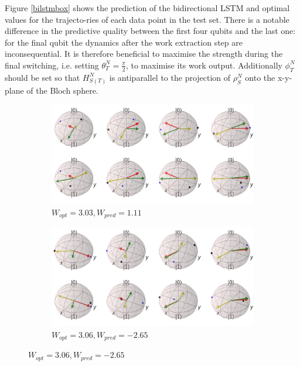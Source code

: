 Figure \ref{bilstmbox} shows the prediction of the bidirectional LSTM and optimal values for the trajecto-ries of each data point in the test set.
There is a notable difference in the predictive quality between the first four qubits and the last one: for the final qubit the dynamics after the work extraction step are inconsequential.
It is therefore beneficial to maximise the strength during the final switching, i.e. setting $\theta_T^N = \frac{\pi}{2}$, to maximise its work output.
Additionally $\phi_T^N$ should be set so that $H_{S(T)}^N$ is antiparallel to the projection of $\rho_S^N$ onto the x-y-plane of the Bloch sphere.

\newpage

\begin{figure}[H]
	\centering
	\begin{subfigure}{0.85\textwidth}
		\centering
		\includegraphics[width=\textwidth]{img/bloch_10553_crop_sphere2}
		\caption{$W_{opt} = 3.03, W_{pred} = 1.11$}
		\label{bloch_10553}
	\end{subfigure}
	\begin{subfigure}{0.85\textwidth}
		\centering
		\includegraphics[width=\textwidth]{img/bloch_worst_crop_sphere2}
		\caption{$W_{opt} = 3.06, W_{pred} = -2.65$}
		\label{bloch_worst}
	\end{subfigure}

\end{figure}
